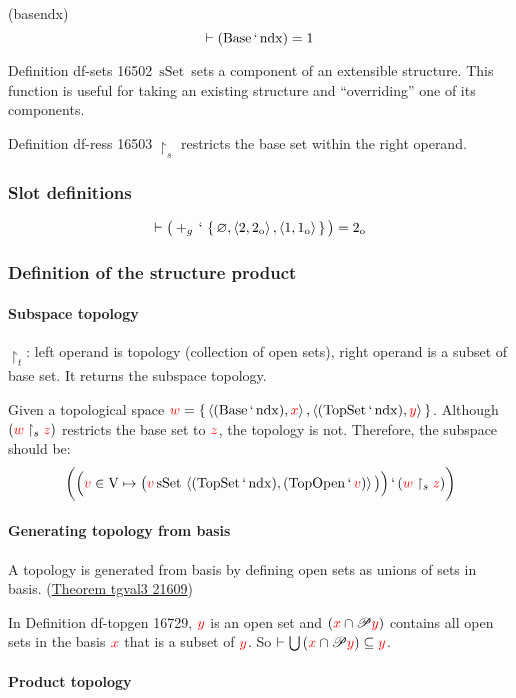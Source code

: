 \documentclass[12pt, letterpaper]{article}
\newcommand{\union}[2][]{
	\ifthenelse { \equal {#1} {} }
		{ \bigcup{#2} } %
		{ {#1}\cup{#2} } %
}
\newcommand{\inters}[2][]{
	\ifthenelse { \equal {#1} {} }
	{ \bigcap{#2} } %
	{ {#1}\cap{#2} } %
}
\newcommand{\sSet}{\,\mathrm{sSet}\,}
\newcommand{\ndx}{\mathrm{ndx}}
\newcommand{\Base}{\mathrm{Base}}
\newcommand{\TopSet}{\mathrm{TopSet}}
\newcommand{\TopOpen}{\mathrm{TopOpen}}
\newcommand{\red}[1]{{\color{red} #1}}
\renewcommand{\emptyset}{\varnothing}
\newcommand{\provable}{\vdash}
\newcommand{\setvar}{\red}
\newcommand{\sv}{\setvar{v}}
\newcommand{\sw}{\setvar{w}}
\newcommand{\sx}{\setvar{x}}
\newcommand{\sy}{\setvar{y}}
\newcommand{\sz}{\setvar{z}}
\newcommand{\VV}{\mathrm{V}}
\newcommand{\at}{\,`\,}
\newcommand{\ordsuf}[1]{{#1}_{\mathrm{o}}}
\newcommand{\oneo}{\ordsuf{1}}
\newcommand{\twoo}{\ordsuf{2}}
\newcommand{\opair}[2]{\left\langle{{#1},{#2}}\right\rangle}
\newcommand{\power}{\mathscr{P}}
\theoremstyle{definition}
\theoremstyle{remark}
\theoremstyle{definition}
\theoremstyle{plain}
\begin{document}
	(basendx)
	\[\provable(\Base\at\ndx)=1\]
	
	Definition df-sets 16502
	$\sSet$
	sets a component of an extensible structure. This function is useful for taking an existing structure and ``overriding'' one of its components.
	
	Definition df-ress 16503
	$\restriction_s$
	restricts the base set within the right operand.
	
	\subsubsection{Slot definitions}
	\[\provable
	\big(+_g\at\set{\emptyset,\opair{2}{\twoo},\opair{1}{\oneo}}\big)=\twoo\]
	
	\subsubsection{Definition of the structure product}
	
	\paragraph{Subspace topology}
	$\restriction_t$: left operand is topology (collection of open sets), right operand is a subset of base set.
	It returns the subspace topology.

	Given a topological space $\sw=\set{\opair{(\Base\at\ndx)}{\sx},\opair{(\TopSet\at\ndx)}{\sy}}$.
	Although
	$(\sw\restriction_s\sz)$ restricts the base set to $\sz$, the topology is not.
	Therefore, the subspace should be:
	\[\bigg(\Big(\sv\in\VV\mapsto\big(\sv\sSet\opair{(\TopSet\at\ndx)}{(\TopOpen\at\sv)}\big)\Big)\at(\sw\restriction_s\sz)\bigg)\]
	
	\paragraph{Generating topology from basis}
	A topology is generated from basis by defining open sets as unions of sets in basis.
	(\href{https://us.metamath.org/mpeuni/tgval3.html}{Theorem tgval3 21609})
	
	In Definition df-topgen 16729, $\sy$ is an open set and $(\inters[\sx]{\power\sy})$ contains all open sets in the basis $\sx$ that is a subset of $\sy$. So $\provable\union{(\inters[\sx]{\power\sy})}\subseteq\sy$.
	
	\paragraph{Product topology}
	
\end{document}

